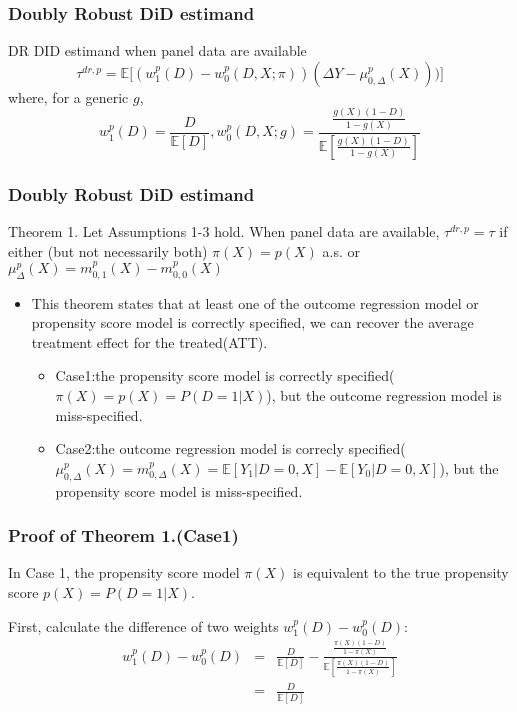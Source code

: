 \documentclass{beamer}
\begin{document}
\begin{frame}\frametitle{Doubly Robust DiD estimand}
    \begin{block}{DR DID estimand when panel data are available}
        \begin{equation*}
        \tau^{dr,p} = \mathbb{E}\lbrack (w^{p}_{1}(D)- w^{p}_{0}(D,X;\pi))(\Delta Y - \mu ^{p}_{0,\Delta}(X)))\rbrack
        \end{equation*}
        where, for a generic $g$,
        \begin{equation*}
            w^{p}_{1}(D) = \frac{D}{ \mathbb{E}[D]},w^{p}_{0}(D,X;g) = \frac{ \frac{g(X)(1-D)}{1-g(X)}}{ \mathbb{E}[\frac{g(X)(1-D)}{1-g(X)}]}
        \end{equation*}
    \end{block}
\end{frame}

\begin{frame}\frametitle{Doubly Robust DiD estimand}
    \begin{block}{Theorem 1.}
        Let Assumptions 1-3 hold. When panel data are available, $\tau ^{dr,p} = \tau$ if either (but not necessarily both) $\pi(X) = p(X)$ a.s. or $\mu ^{p}_{\Delta}(X) = m^{p}_{0,1}(X) - m^{p}_{0,0}(X)$
    \end{block}

    \begin{itemize}
        \item This theorem states that at least one of the outcome regression model or propensity score model is correctly specified, we can recover the average treatment effect for the treated(ATT).
        \begin{itemize}
            \item Case1:the propensity score model is correctly specified($\pi(X) = p(X) = P(D = 1|X)$), but the outcome regression model is miss-specified.
            \item Case2:the outcome regression model is correcly specified($\mu ^{p}_{0,\Delta}(X) = m^{p}_{0,\Delta}(X) = \mathbb{E}[Y_{1}|D = 0, X] - \mathbb{E}[Y_{0}|D = 0, X]$), but the propensity score model is miss-specified.
        \end{itemize}
    \end{itemize}

\end{frame}

\begin{frame}\frametitle{Proof of Theorem 1.(Case1)}
    In Case 1, the propensity score model $\pi(X)$ is equivalent to the true propensity score $p(X) = P(D = 1|X)$. 

    First, calculate the difference of two weights $w^{p}_{1}(D) - w^{p}_{0}(D)$:
    \begin{eqnarray*}
        w^{p}_{1}(D) - w^{p}_{0}(D) &=& \frac{D}{ \mathbb{E}[D]} - \frac{ \frac{\pi(X)(1-D)}{1-\pi(X)}}{ \mathbb{E}[\frac{\pi(X)(1-D)}{1-\pi(X)}]} \\
        &=& \frac{D}{\mathbb{E}[D]}
    \end{eqnarray*}
\end{frame}
\end{document}
